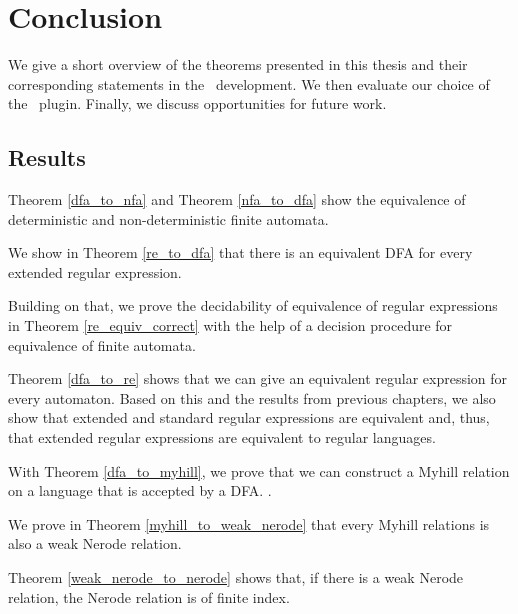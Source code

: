 \chapter{Conclusion}
We give a short overview of the theorems presented in this thesis and their corresponding statements in the \coq\ development.
We then evaluate our choice of the \ssreflect\ plugin.
Finally, we discuss opportunities for future work. 

\section{Results}
\label{chap:conclusion}
Theorem \ref{dfa_to_nfa} and Theorem \ref{nfa_to_dfa} 
show the equivalence of deterministic and non-deterministic finite automata.

We show in Theorem \ref{re_to_dfa} that there is an equivalent DFA for every extended regular expression. 

Building on that, we prove the decidability of equivalence of regular expressions in Theorem \ref{re_equiv_correct} with the help of a decision procedure for equivalence of finite automata.

Theorem \ref{dfa_to_re} shows that we can give an equivalent regular expression for every automaton. 
Based on this and the results from previous chapters, we also show that extended and standard regular expressions are equivalent and, thus, that extended regular expressions are equivalent to regular languages.

With Theorem \ref{dfa_to_myhill}, we prove that we can construct a Myhill relation on a language that is accepted by a DFA.
.

We prove in Theorem \ref{myhill_to_weak_nerode} that every Myhill relations is also a weak Nerode relation.

Theorem \ref{weak_nerode_to_nerode} shows that, if there is a weak Nerode relation, the Nerode relation is of finite index.

